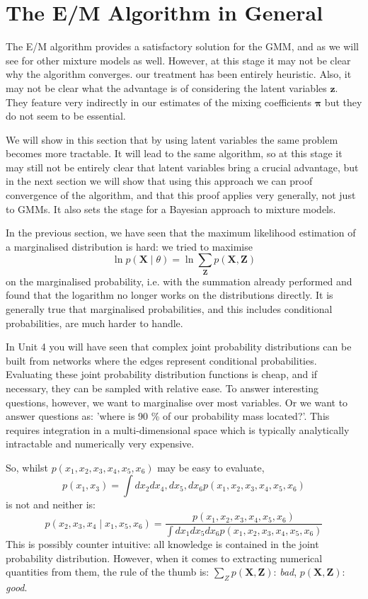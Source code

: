 \section{The E/M Algorithm in General}
\label{sec-gmm}
The E/M algorithm provides a satisfactory solution for the GMM, and as we will see for other mixture models as well. However, at this stage it may not be clear
why the algorithm converges. our treatment has been entirely heuristic. Also, it may not be clear what the advantage is of considering the latent variables
$\boldsymbol{z}$. They feature very indirectly in our estimates of the mixing coefficients $\boldsymbol{\pi}$ but they do not seem to be essential.

We will show in this section that by using latent variables the same problem becomes more tractable. It will lead to the same algorithm, so at this stage
it may still not be entirely clear that latent variables bring a crucial advantage, but in the next section we will show that using this approach
we can proof convergence of the algorithm, and that this proof applies very generally, not just to GMMs. It also sets the stage for a Bayesian
approach to mixture models.

In the previous section, we have seen that the maximum likelihood estimation of a marginalised distribution is hard: we tried to maximise
$$
\ln p(\boldsymbol{X} \mid \theta) = \ln \sum_{\boldsymbol{Z}} p(\boldsymbol{X}, \boldsymbol{Z} )
$$
on the marginalised probability, i.e. with the summation already performed and found that the logarithm no longer works on the distributions directly. It is
generally true that marginalised probabilities, and this includes conditional probabilities, are much harder to handle.

In Unit 4 you will have seen that complex joint probability distributions can be built from networks where the edges represent conditional probabilities. Evaluating these
joint probability distribution functions is cheap, and if necessary, they can be sampled with relative ease. To answer interesting questions, however,
we want to marginalise over most variables. Or we want to answer questions as: 'where is 90 \% of our probability mass located?'. This requires
integration in a multi-dimensional space which is typically analytically intractable and numerically very expensive.

So, whilst $p(x_1, x_2, x_3, x_4, x_5, x_6)$ may be easy to evaluate,
$$
p(x_1, x_3) = \int d x_2 d x_4,  d x_5, d x_6 p(x_1, x_2, x_3, x_4, x_5, x_6) 
$$
is not and neither is:
$$
p(x_2, x_3, x_4 \mid x_1, x_5, x_6) = \frac{p(x_1, x_2, x_3, x_4, x_5, x_6)}{\int d x_1 d x_5 d x_6 p(x_1, x_2, x_3, x_4, x_5, x_6)}  
$$
This is possibly counter intuitive: all knowledge is contained in the joint probability distribution. However, when it comes to extracting
numerical quantities from them, the rule of the thumb is: $\sum_{Z} p(\boldsymbol{X}, \boldsymbol{Z})$: \emph{bad}, $p(\boldsymbol{X}, \boldsymbol{Z})$: \emph{good}.

